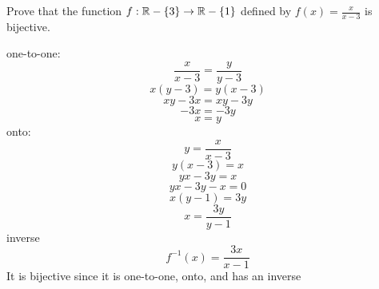 \documentclass{homework}
\begin{document}
\question Prove that the function $f:\mathbb{R}-\{3\} \rightarrow \mathbb{R} - \{1\}$ deﬁned by $f(x)=\frac{x}{x-3}$ is bijective.

\begin{sol}
  one-to-one: \smallbreak
  \[\frac{x}{x-3}=\frac{y}{y-3}\] \smallbreak
  \[x(y-3)=y(x-3)\] \smallbreak
  \[xy-3x=xy-3y\] \smallbreak
  \[-3x=-3y\] \smallbreak
  \[x=y\] \smallbreak
  onto: \smallbreak
  \[y=\frac{x}{x-3}\] \smallbreak
  \[y(x-3)=x\] \smallbreak
  \[yx-3y=x\] \smallbreak
  \[yx-3y-x=0\] \smallbreak
  \[x(y-1)=3y\] \smallbreak
  \[x=\frac{3y}{y-1}\]
  inverse \smallbreak
  \[f^{-1}(x)=\frac{3x}{x-1}\] \smallbreak
  It is bijective since it is one-to-one, onto, and has an inverse
\end{sol}
\end{document}

